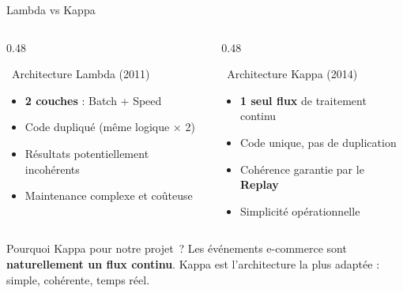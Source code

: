 \documentclass[aspectratio=169, 12pt]{beamer}
\begin{document}
\begin{frame}{Lambda vs Kappa}
  \begin{columns}[T]
    \begin{column}{0.48\textwidth}
      \begin{alertblock}{\faTimesCircle\ Architecture Lambda (2011)}
        \begin{itemize}
          \item \textbf{2 couches} : Batch + Speed
          \item Code dupliqué (même logique × 2)
          \item Résultats potentiellement incohérents
          \item Maintenance complexe et coûteuse
        \end{itemize}
      \end{alertblock}
    \end{column}
    \begin{column}{0.48\textwidth}
      \begin{exampleblock}{\faCheckCircle\ Architecture Kappa (2014)}
        \begin{itemize}
          \item \textbf{1 seul flux} de traitement continu
          \item Code unique, pas de duplication
          \item Cohérence garantie par le \textbf{Replay}
          \item Simplicité opérationnelle
        \end{itemize}
      \end{exampleblock}
    \end{column}
  \end{columns}
  \vspace{0.4cm}
  \begin{block}{Pourquoi Kappa pour notre projet~?}
    \centering
    Les événements e-commerce sont \textbf{naturellement un flux continu}. Kappa est l'architecture la plus adaptée : simple, cohérente, temps réel.
  \end{block}
\end{frame}
\end{document}
